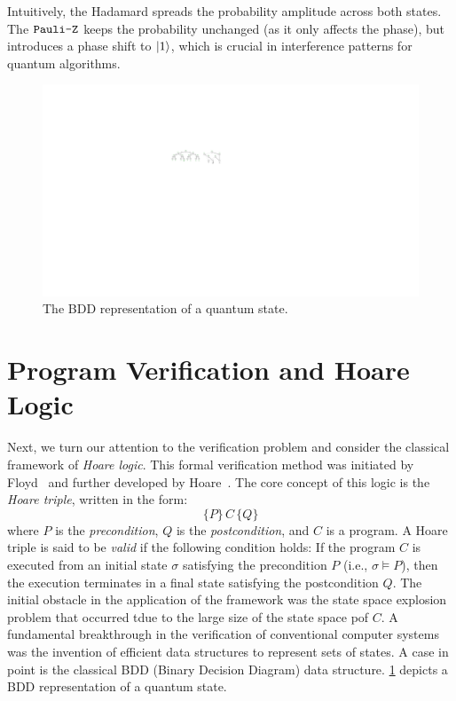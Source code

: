 Intuitively, the Hadamard spreads the probability amplitude across both states.
%
The $\texttt{Pauli-Z}$ keeps the probability unchanged (as it only affects the phase), but introduces a phase shift to $|1\rangle$, which is crucial in interference patterns for quantum algorithms.


\begin{figure}[ht] 
    \centering
    \includegraphics[scale=1.2]{Figures/BDDs/BDDs} 
    \caption{The BDD representation of a quantum state.}
    \label{BDD:fig}
\end{figure}

%

\section{Program Verification and Hoare Logic}
%
Next, we turn our attention to the verification problem and consider the classical framework of \emph{Hoare logic}.  
%
This formal verification method was initiated by  Floyd~\cite{Flo67a} and further developed by Hoare~\cite{DBLP:journals/cacm/Hoare69}.  
%
The core concept of this logic is the \emph{Hoare triple}, written in the form:
\[
\{P\}\, C\, \{Q\}
\]
where $P$ is the \emph{precondition}, $Q$ is the \emph{postcondition}, and $C$ is a program.  
%
A Hoare triple is said to be \emph{valid} if the following condition holds:
If the program $C$ is executed from an initial state $\sigma$ satisfying the precondition $P$ (i.e., $\sigma \models P$), then the execution terminates in a final state satisfying the postcondition $Q$.
%
The initial obstacle in the application of the framework was the state space explosion problem that occurred tdue to the large size of the state space pof $C$.
%
A fundamental breakthrough in the verification of conventional computer systems was the invention of efficient data structures to represent sets of states.
A case in point is the classical BDD (Binary Decision Diagram) data structure.
%
\cref{BDD:fig} depicts a BDD representation of a quantum state.

